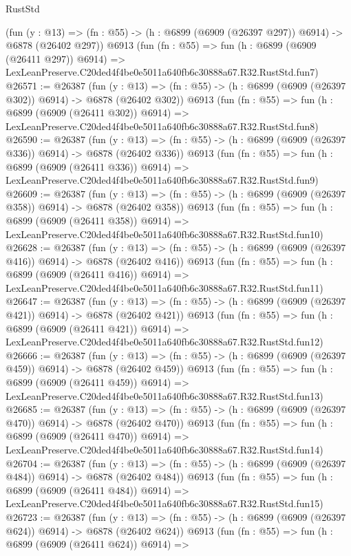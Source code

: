 \begin{lexlean}{RustStd}
\begin{coremodule}
    (fun (y : @13) => (fn : @55) -> (h : @6899 (@6909 (@26397 @297)) @6914) -> @6878 (@26402 @297))
    @6913
    (fun (fn : @55) =>
    fun (h : @6899 (@6909 (@26411 @297)) @6914) =>
    LexLeanPreserve.C20ded4f4be0e5011a640fb6c30888a67.R32.RustStd.fun7)
@26571 := @26387
    (fun (y : @13) => (fn : @55) -> (h : @6899 (@6909 (@26397 @302)) @6914) -> @6878 (@26402 @302))
    @6913
    (fun (fn : @55) =>
    fun (h : @6899 (@6909 (@26411 @302)) @6914) =>
    LexLeanPreserve.C20ded4f4be0e5011a640fb6c30888a67.R32.RustStd.fun8)
@26590 := @26387
    (fun (y : @13) => (fn : @55) -> (h : @6899 (@6909 (@26397 @336)) @6914) -> @6878 (@26402 @336))
    @6913
    (fun (fn : @55) =>
    fun (h : @6899 (@6909 (@26411 @336)) @6914) =>
    LexLeanPreserve.C20ded4f4be0e5011a640fb6c30888a67.R32.RustStd.fun9)
@26609 := @26387
    (fun (y : @13) => (fn : @55) -> (h : @6899 (@6909 (@26397 @358)) @6914) -> @6878 (@26402 @358))
    @6913
    (fun (fn : @55) =>
    fun (h : @6899 (@6909 (@26411 @358)) @6914) =>
    LexLeanPreserve.C20ded4f4be0e5011a640fb6c30888a67.R32.RustStd.fun10)
@26628 := @26387
    (fun (y : @13) => (fn : @55) -> (h : @6899 (@6909 (@26397 @416)) @6914) -> @6878 (@26402 @416))
    @6913
    (fun (fn : @55) =>
    fun (h : @6899 (@6909 (@26411 @416)) @6914) =>
    LexLeanPreserve.C20ded4f4be0e5011a640fb6c30888a67.R32.RustStd.fun11)
@26647 := @26387
    (fun (y : @13) => (fn : @55) -> (h : @6899 (@6909 (@26397 @421)) @6914) -> @6878 (@26402 @421))
    @6913
    (fun (fn : @55) =>
    fun (h : @6899 (@6909 (@26411 @421)) @6914) =>
    LexLeanPreserve.C20ded4f4be0e5011a640fb6c30888a67.R32.RustStd.fun12)
@26666 := @26387
    (fun (y : @13) => (fn : @55) -> (h : @6899 (@6909 (@26397 @459)) @6914) -> @6878 (@26402 @459))
    @6913
    (fun (fn : @55) =>
    fun (h : @6899 (@6909 (@26411 @459)) @6914) =>
    LexLeanPreserve.C20ded4f4be0e5011a640fb6c30888a67.R32.RustStd.fun13)
@26685 := @26387
    (fun (y : @13) => (fn : @55) -> (h : @6899 (@6909 (@26397 @470)) @6914) -> @6878 (@26402 @470))
    @6913
    (fun (fn : @55) =>
    fun (h : @6899 (@6909 (@26411 @470)) @6914) =>
    LexLeanPreserve.C20ded4f4be0e5011a640fb6c30888a67.R32.RustStd.fun14)
@26704 := @26387
    (fun (y : @13) => (fn : @55) -> (h : @6899 (@6909 (@26397 @484)) @6914) -> @6878 (@26402 @484))
    @6913
    (fun (fn : @55) =>
    fun (h : @6899 (@6909 (@26411 @484)) @6914) =>
    LexLeanPreserve.C20ded4f4be0e5011a640fb6c30888a67.R32.RustStd.fun15)
@26723 := @26387
    (fun (y : @13) => (fn : @55) -> (h : @6899 (@6909 (@26397 @624)) @6914) -> @6878 (@26402 @624))
    @6913
    (fun (fn : @55) =>
    fun (h : @6899 (@6909 (@26411 @624)) @6914) =>

\end{coremodule}
\end{lexlean}
